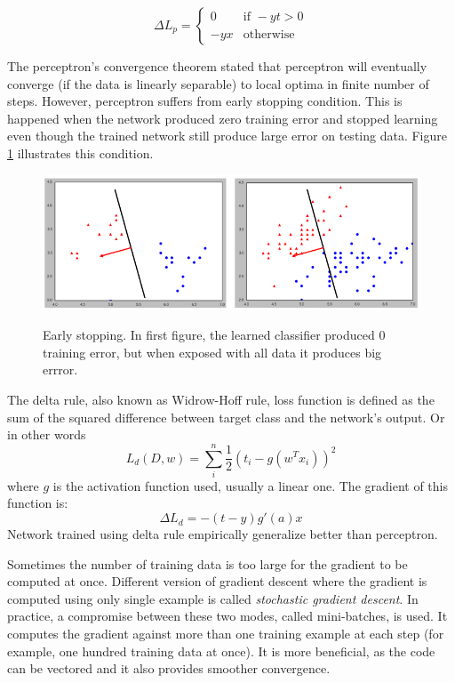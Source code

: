 \documentclass[a4paper,11pt]{kth-mag}
\begin{document}
\begin{equation}
\Delta L_p = 
	\begin{cases}
		0 & \text{if } -y t > 0 \\
		-y x & \text{otherwise}
	\end{cases}
\end{equation}

The perceptron's convergence theorem stated that perceptron will eventually converge (if the data is linearly separable) to local optima in finite number of steps. However, perceptron suffers from early stopping condition. This is happened when the network produced zero training error and stopped learning even though the trained network still produce large error on testing data. Figure \ref{fig:early} illustrates this condition.

\begin{figure}[h]
\centering
\includegraphics[scale=0.5]{image/early_stopping.png}
\label{fig:early}
\caption{Early stopping. In first figure, the learned classifier produced 0 training error, but when exposed with all data it produces big errror.}
\end{figure}

The delta rule, also known as Widrow-Hoff rule, loss function is defined as the sum of the squared difference between target class and the network's output. Or in other words
\begin{equation}
L_d(D, w) = \sum^n_i \frac{1}{2} (t_i - g(w^T x_i))^2
\end{equation}
where $g$ is the activation function used, usually a linear one. The gradient of this function is:
\begin{equation}
\Delta L_d = -(t - y) g'(a) x
\end{equation}
Network trained using delta rule empirically generalize better than perceptron.

Sometimes the number of training data is too large for the gradient to be computed at once. Different version of gradient descent where the gradient is computed using only single example is called \textit{stochastic gradient descent}. In practice, a compromise between these two modes, called mini-batches, is used. It computes the gradient against more than one training example at each step (for example, one hundred training data at once). It is more beneficial, as the code can be vectored and it also provides smoother convergence.
\end{document}
